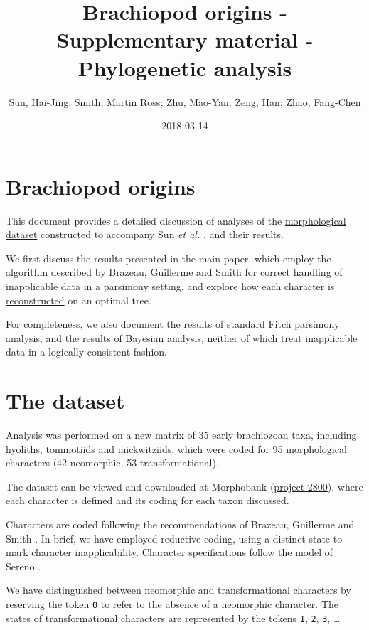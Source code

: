 \documentclass[]{book}
\title{Brachiopod origins - Supplementary material - Phylogenetic analysis}
\author{Sun, Hai-Jing; Smith, Martin Ross; Zhu, Mao-Yan; Zeng, Han; Zhao,
Fang-Chen}
\date{2018-03-14}
\theoremstyle{definition}
\theoremstyle{definition}
\theoremstyle{definition}
\theoremstyle{remark}
\begin{document}
\maketitle

{
\setcounter{tocdepth}{1}
\tableofcontents
}
\hypertarget{brachiopod-origins}{%
\chapter*{Brachiopod origins}\label{brachiopod-origins}}

This document provides a detailed discussion of analyses of the
\protect\hyperlink{dataset}{morphological dataset} constructed to
accompany Sun \emph{et al.} \citeyearpar{Sun2018}, and their results.

We first discuss the results presented in the main paper, which employ
the algorithm described by Brazeau, Guillerme and Smith
\citeyearpar{Brazeau2018} for correct handling of inapplicable data in a
parsimony setting, and explore how each character is
\protect\hyperlink{reconstructions}{reconstructed} on an optimal tree.

For completeness, we also document the results of
\protect\hyperlink{tnt}{standard Fitch parsimony} analysis, and the
results of \protect\hyperlink{MrBayes}{Bayesian analysis}, neither of
which treat inapplicable data in a logically consistent fashion.

\hypertarget{the-dataset}{%
\chapter{The dataset}\label{the-dataset}}

Analysis was performed on a new matrix of 35 early brachiozoan taxa,
including hyoliths, tommotiids and mickwitziids, which were coded for 95
morphological characters (42 neomorphic, 53 transformational).

The dataset can be viewed and downloaded at Morphobank
(\href{https://morphobank.org/permalink/?P2800}{project 2800}), where
each character is defined and its coding for each taxon discussed.

Characters are coded following the recommendations of Brazeau, Guillerme
and Smith \citep{Brazeau2018}. In brief, we have employed reductive
coding, using a distinct state to mark character inapplicability.
Character specifications follow the model of Sereno
\citeyearpar{Sereno2007}.

We have distinguished between neomorphic and transformational characters
\citep[sensu][]{Sereno2007} by reserving the token \texttt{0} to refer
to the absence of a neomorphic character. The states of transformational
characters are represented by the tokens \texttt{1}, \texttt{2},
\texttt{3}, \ldots{}
\end{document}
